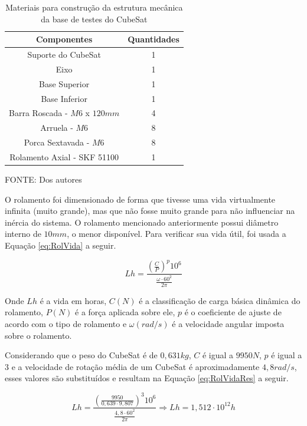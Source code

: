 \documentclass[
	12pt,				%
	openany,			%
	twoside,			%
	a4paper,			%
	english,			%
	french,				%
	spanish,			%
	brazil,				%
	oldfontcommands
	]{abntex2}
\begin{document}
\begin{table}[h]
	\caption{Materiais para construção da estrutura mecânica da base de testes do CubeSat}
		\centering
	\begin{tabular}{|c|c|}
		\hline
		\textbf{Componentes} & \textbf{Quantidades} \\ 
		\hline 
		Suporte do CubeSat & 1 \\ 
		\hline 
		Eixo & 1 \\
		\hline
		Base Superior & 1 \\ 
		\hline 
		Base Inferior & 1 \\
		\hline 
		Barra Roscada - $M6$ x $120mm$ & 4 \\
		\hline 
		Arruela - $M6$ & 8 \\ 
		\hline 
		Porca Sextavada - $M6$ & 8 \\ 
		\hline 
		Rolamento Axial - SKF 51100 & 1 \\
		\hline
	\end{tabular}
	
	\begin{small}
	\vspace{3pt}	
	FONTE: Dos autores
	\end{small}
	\label{tab:MatTB}
\end{table}

O rolamento foi dimensionado de forma que tivesse uma vida virtualmente infinita (muito grande), mas que não fosse muito grande para não influenciar na inércia do sistema. O rolamento mencionado anteriormente possui diâmetro interno de $10mm$, o menor disponível. Para verificar sua vida útil, foi usada a Equação \ref{eq:RolVida} a seguir.

\begin{equation}
Lh = \frac{ \left( \frac{C}{P} \right)^{p} 10^{6}}{\frac{\omega \cdot 60^{2}}{2 \pi}}
\label{eq:RolVida}
\end{equation}

Onde $Lh$ é a vida em horas, $C(N)$ é a classificação de carga básica dinâmica do rolamento, $P(N)$ é a força aplicada sobre ele, $p$ é o coeficiente de ajuste de acordo com o tipo de rolamento e $\omega(rad/s)$ é a velocidade angular imposta sobre o rolamento.

Considerando que o peso do CubeSat é de $0,631kg$, $C$ é igual a $9950N$, $p$ é igual a $3$ e a velocidade de rotação média de um CubeSat é aproximadamente $4,8rad/s$, esses valores são substituídos e resultam na Equação \ref{eq:RolVidaRes} a seguir.

\begin{equation}
Lh = \frac{ \left( \frac{9950}{0,639 \cdot 9,807 } \right)^{3} 10^{6}}{\frac{4,8 \cdot 60^{2}}{2 \pi}} \Longrightarrow Lh = 1,512 \cdot 10^{12} h
\label{eq:RolVidaRes}
\end{equation}
\end{document}
